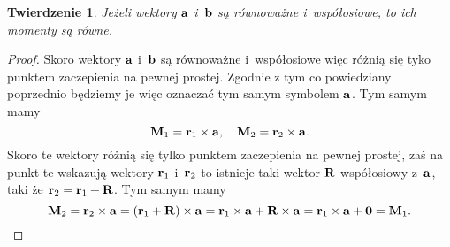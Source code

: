 \documentclass[a4paper,11pt]{article}
\newtheorem{theorem}{Twierdzenie}  %
\begin{document}
\begin{theorem}

  Jeżeli wektory $\mathbf{a}$ i~$\mathbf{b}$ są równoważne i~współosiowe, to
  ich momenty są równe.

\end{theorem}



\begin{proof}

  Skoro wektory
  $\mathbf{a}$ i~$\mathbf{b}$ są równoważne i~współosiowe więc różnią się tyko
  punktem zaczepienia na pewnej prostej. Zgodnie z tym co powiedziany
  poprzednio będziemy je więc oznaczać tym samym symbolem $\mathbf{a}$. Tym
  samym mamy
  \begin{equation}
    \label{eq:SkalmierskiMechanika-07}
    \mathbf{M}_{ 1 } = \mathbf{r}_{ 1 } \times \mathbf{a}, \quad
    \mathbf{M}_{ 2 } = \mathbf{r}_{ 2 } \times \mathbf{a}.
  \end{equation}
  Skoro te wektory różnią się tylko punktem zaczepienia na pewnej prostej,
  zaś na punkt te wskazują wektory $\mathbf{r}_{ 1 }$ i~$\mathbf{r}_{ 2 }$ to
  istnieje taki wektor $\mathbf{R}$ współosiowy z~$\mathbf{a}$, taki że
  $\mathbf{r}_{ 2 } = \mathbf{r}_{ 1 } + \mathbf{R}$. Tym samym mamy
  \begin{equation}
    \label{eq:SkalmierskiMechanika-08}
    \mathbf{M}_{ 2 } =
    \mathbf{r}_{ 2 } \times \mathbf{a} =
    ( \mathbf{r}_{ 1 } + \mathbf{R} ) \times \mathbf{a} =
    \mathbf{r}_{ 1 } \times \mathbf{a} + \mathbf{R} \times \mathbf{a} =
    \mathbf{r}_{ 1 } \times \mathbf{a} + \mathbf{0} = \mathbf{M}_{ 1 }.
  \end{equation}

\end{proof}









\newpage

\end{document}
